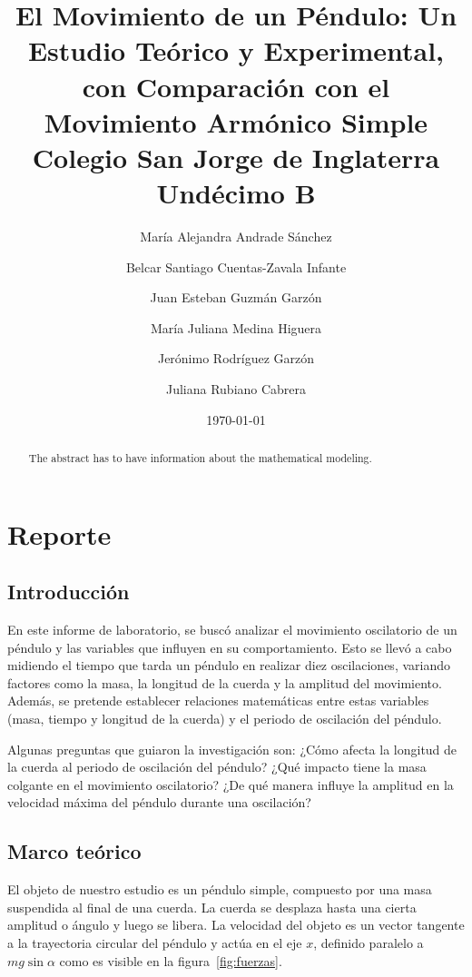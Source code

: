 \documentclass[twocolumn]{report}
\title{
  El Movimiento de un Péndulo: Un Estudio Teórico y Experimental, con
  Comparación con el Movimiento Armónico Simple \\
  {\large Colegio San Jorge de Inglaterra \\
  Undécimo B}
}
\author{
  María Alejandra Andrade Sánchez \and
  Belcar Santiago Cuentas-Zavala Infante \and
  Juan Esteban Guzmán Garzón \and
  María Juliana Medina Higuera \and
  Jerónimo Rodríguez Garzón \and
  Juliana Rubiano Cabrera
}
\date{\today}
\numberwithin{table}{section}
\begin{document}
\maketitle

\newpage
\tableofcontents

\chapter{Reporte}

\begin{abstract}
  {\color{red} The abstract has to have information
  about the mathematical modeling.}
\end{abstract}

\section{Introducción}

En este informe de laboratorio, se buscó analizar el movimiento
oscilatorio de un péndulo y las variables que influyen en su
comportamiento. Esto se llevó a cabo midiendo el tiempo que tarda un
péndulo en realizar diez oscilaciones, variando factores como la
masa, la longitud de la cuerda y la amplitud del movimiento. Además,
se pretende establecer relaciones matemáticas entre estas variables
(masa, tiempo y longitud de la cuerda) y el periodo de oscilación del
péndulo.

Algunas preguntas que guiaron la investigación son: ¿Cómo
afecta la longitud de la cuerda al periodo de oscilación del péndulo?
¿Qué impacto tiene la masa colgante en el movimiento oscilatorio? ¿De
qué manera influye la amplitud en la velocidad máxima del péndulo
durante una oscilación?

\section{Marco teórico}

El objeto de nuestro estudio es un péndulo simple, compuesto por una masa
suspendida al final de una cuerda. La cuerda se desplaza hasta una
cierta amplitud o ángulo y luego se libera. La velocidad del objeto
es un vector tangente a la trayectoria circular del péndulo y actúa
en el eje $x$, definido paralelo a $mg\sin{\alpha}$ como es visible
en la figura~\ref{fig:fuerzas}.
\end{document}
